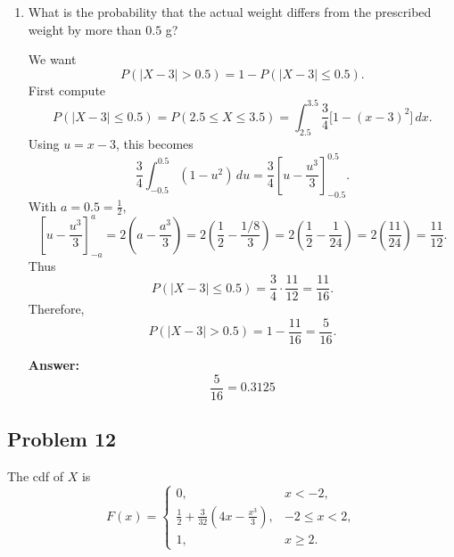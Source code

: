 \documentclass[11pt]{article}
\begin{document}
\begin{enumerate}
    \textbf{Answer:}
    \[
    \boxed{\frac{47}{128}\approx 0.3672}
    \]

    \item[(e)] What is the probability that the actual weight differs from the prescribed weight by more than \(0.5\) g?

    We want
    \[
    P(|X-3|>0.5)=1-P(|X-3|\le 0.5).
    \]
    First compute
    \[
    P(|X-3|\le 0.5)=P(2.5\le X\le 3.5)
    =\int_{2.5}^{3.5}\frac34\bigl[1-(x-3)^2\bigr]\,dx.
    \]
    Using \(u=x-3\), this becomes
    \[
    \frac34\int_{-0.5}^{0.5}(1-u^2)\,du
    =\frac34\left[u-\frac{u^3}{3}\right]_{-0.5}^{0.5}.
    \]
    With \(a=0.5=\frac12\),
    \[
    \left[u-\frac{u^3}{3}\right]_{-a}^{a}
    =2\left(a-\frac{a^3}{3}\right)
    =2\left(\frac12-\frac{1/8}{3}\right)
    =2\left(\frac12-\frac{1}{24}\right)
    =2\left(\frac{11}{24}\right)
    =\frac{11}{12}.
    \]
    Thus
    \[
    P(|X-3|\le 0.5)=\frac34\cdot \frac{11}{12}=\frac{11}{16}.
    \]
    Therefore,
    \[
    P(|X-3|>0.5)=1-\frac{11}{16}=\frac{5}{16}.
    \]

    \textbf{Answer:}
    \[
    \boxed{\frac{5}{16}=0.3125}
    \]
\end{enumerate}

\subsection*{Problem 12}

The cdf of \(X\) is
\[
F(x)=
\begin{cases}
0, & x<-2,\\[4pt]
\displaystyle \frac12+\frac{3}{32}\left(4x-\frac{x^3}{3}\right), & -2\le x<2,\\[8pt]
1, & x\ge 2.
\end{cases}
\]
\end{document}
